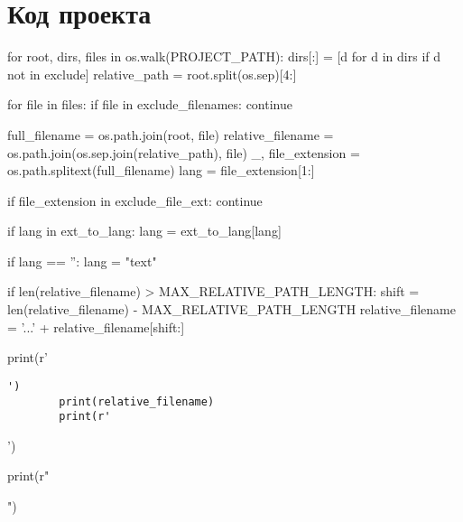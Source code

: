 \section{Код проекта}
\begin{pycode}
for root, dirs, files in os.walk(PROJECT_PATH):
    dirs[:] = [d for d in dirs if d not in exclude]
    relative_path = root.split(os.sep)[4:]

    for file in files:
        if file in exclude_filenames:
                continue

        full_filename = os.path.join(root, file)
        relative_filename = os.path.join(os.sep.join(relative_path), file)
        _, file_extension = os.path.splitext(full_filename)
        lang = file_extension[1:]

        if file_extension in exclude_file_ext:
            continue

        if lang in ext_to_lang:
            lang = ext_to_lang[lang]

        if lang == '':
            lang = "text"

        if len(relative_filename) > MAX_RELATIVE_PATH_LENGTH:
            shift = len(relative_filename) - MAX_RELATIVE_PATH_LENGTH
            relative_filename = '...' + relative_filename[shift:]

        print(r'\begin{verbatim}')
        print(relative_filename)
        print(r'\end{verbatim}')

        print(r"")
\end{pycode}

\clearpage